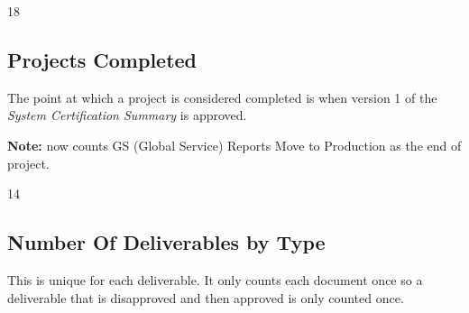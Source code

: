 \documentclass{article}
\begin{document}
\begin{Schunk}
\begin{Soutput}
[1] 18
\end{Soutput}
\end{Schunk}

\subsection{Projects Completed}

The point at which a project is considered completed is when version 1 of the
\textit{System Certification Summary} is approved.

\textbf{Note:} now counts GS (Global Service) Reports Move to Production as the end
of project.

\begin{Schunk}
\begin{Soutput}
[1] 14
\end{Soutput}
\end{Schunk}


\subsection{Number Of Deliverables by Type}
This is unique for each deliverable. It only counts each document once so a deliverable
that is disapproved and then approved is only counted once.
\end{document}
